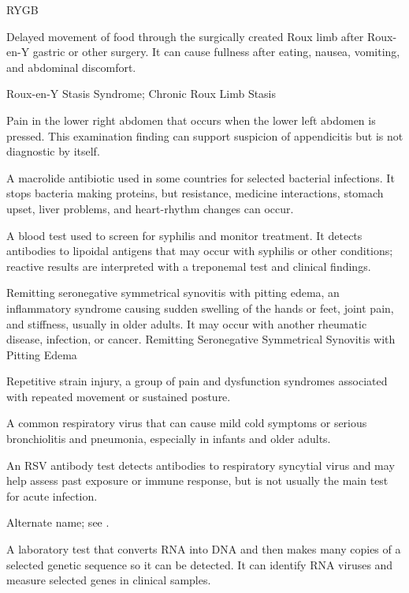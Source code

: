 \synonyms
RYGB

 Delayed movement of food through the surgically created Roux limb after Roux-en-Y gastric or other surgery. It can cause fullness after eating, nausea, vomiting, and abdominal discomfort.

\synonyms
Roux-en-Y Stasis Syndrome; Chronic Roux Limb Stasis

 Pain in the lower right abdomen that occurs when the lower left abdomen is pressed. This examination finding can support suspicion of appendicitis but is not diagnostic by itself.

 A macrolide antibiotic used in some countries for selected bacterial infections. It stops bacteria making proteins, but resistance, medicine interactions, stomach upset, liver problems, and heart-rhythm changes can occur.

 A blood test used to screen for syphilis and monitor treatment. It detects antibodies to lipoidal antigens that may occur with syphilis or other conditions; reactive results are interpreted with a treponemal test and clinical findings.

 Remitting seronegative symmetrical synovitis with pitting edema, an inflammatory syndrome causing sudden swelling of the hands or feet, joint pain, and stiffness, usually in older adults. It may occur with another rheumatic disease, infection, or cancer.
\synonyms
Remitting Seronegative Symmetrical Synovitis with Pitting Edema

 Repetitive strain injury, a group of pain and dysfunction syndromes associated with repeated movement or sustained posture.

 A common respiratory virus that can cause mild cold symptoms or serious bronchiolitis and pneumonia, especially in infants and older adults.

 An RSV antibody test detects antibodies to respiratory syncytial virus and may help assess past exposure or immune response, but is not usually the main test for acute infection.

 Alternate name; see .

 A laboratory test that converts RNA into DNA and then makes many copies of a selected genetic sequence so it can be detected. It can identify RNA viruses and measure selected genes in clinical samples.

